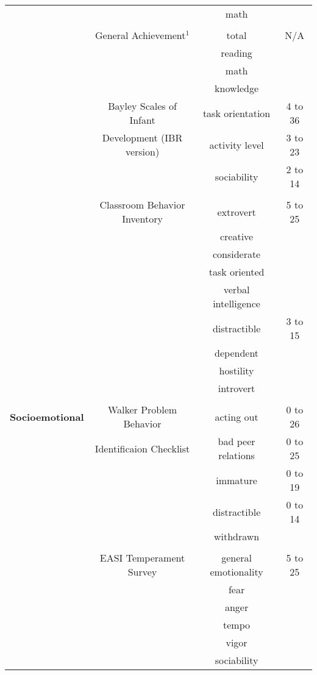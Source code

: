 \begin{ThreePartTable}
\begin{longtable}{c c c c}
        & & math & \\
        & & & \\
        & General Achievement$^1$  & total & N/A \\
        & & reading & \\
        & & math & \\
        & & knowledge & \\
      \midrule
        & Bayley Scales of Infant & task orientation & 4 to 36 \\         
        &  Development (IBR version) & activity level & 3 to 23  \\
        & \citet{Bayley_1969_BSID-Manual} & sociability & 2 to 14  \\
        & & & \\
        & Classroom Behavior Inventory & extrovert & 5 to 25\\
        & \citet{SRI_1972_Schaefer-Behav-Inv} & creative & \\
        & & considerate & \\
        & & task oriented  & \\
        & & verbal intelligence &\\         
        & & distractible & 3 to 15 \\
        & & dependent & \\
        & & hostility & \\
        & & introvert &  \\
        & & & \\
        \textbf{Socioemotional} & Walker Problem Behavior & acting out & 0 to 26  \\
        & Identificaion Checklist & bad peer relations & 0 to 25\\
        & \citet{Walker_1970_Walker-Problem-Behavior} & immature & 0 to 19 \\
        & & distractible & 0 to 14  \\
        & & withdrawn & \\
        & & & \\
        & EASI Temperament Survey & general emotionality & 5 to 25 \\
        & \citet{Buss-Plomin_1975_BOOK_Temperament-Theory} & fear & \\
        & & anger & \\
        & & tempo &\\
        & & vigor &\\
        & & sociability &\\

\end{longtable}
\end{ThreePartTable}
